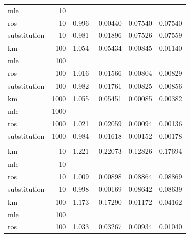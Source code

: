 \documentclass[12pt, twoside]{amherstthesis}
\begin{document}
\begin{table}
\begin{tabular}[t]{lrrrrr}
\hspace{1em}mle & 10 &  &  &  \vphantom{1} & \\
\hspace{1em}ros & 10 & 0.996 & -0.00440 & 0.07540 & 0.07540\\
\hspace{1em}substitution & 10 & 0.981 & -0.01896 & 0.07526 & 0.07559\\
\hspace{1em}km & 100 & 1.054 & 0.05434 & 0.00845 & 0.01140\\
\hspace{1em}mle & 100 &  &  &  \vphantom{1} & \\
\hspace{1em}ros & 100 & 1.016 & 0.01566 & 0.00804 & 0.00829\\
\hspace{1em}substitution & 100 & 0.982 & -0.01761 & 0.00825 & 0.00856\\
\hspace{1em}km & 1000 & 1.055 & 0.05451 & 0.00085 & 0.00382\\
\hspace{1em}mle & 1000 &  &  &  \vphantom{1} & \\
\hspace{1em}ros & 1000 & 1.021 & 0.02059 & 0.00094 & 0.00136\\
\hspace{1em}substitution & 1000 & 0.984 & -0.01618 & 0.00152 & 0.00178\\
\addlinespace[1em]
\multicolumn{6}{l}{\textbf{Censoring Rate = 0.5}}\\
\hspace{1em}km & 10 & 1.221 & 0.22073 & 0.12826 & 0.17694\\
\hspace{1em}mle & 10 &  &  &  & \\
\hspace{1em}ros & 10 & 1.009 & 0.00898 & 0.08864 & 0.08869\\
\hspace{1em}substitution & 10 & 0.998 & -0.00169 & 0.08642 & 0.08639\\
\hspace{1em}km & 100 & 1.173 & 0.17290 & 0.01172 & 0.04162\\
\hspace{1em}mle & 100 &  &  &  & \\
\hspace{1em}ros & 100 & 1.033 & 0.03267 & 0.00934 & 0.01040\\

\end{tabular}
\end{table}
\end{document}
